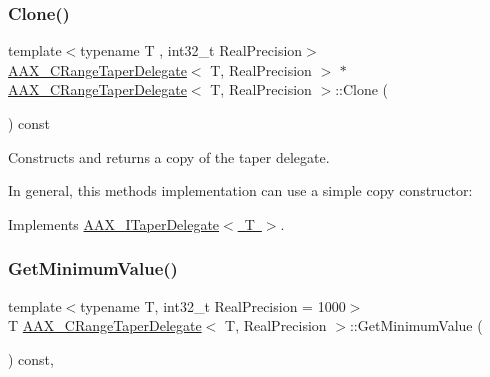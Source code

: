 \subsubsection{\texorpdfstring{Clone()}{Clone()}}
{\footnotesize\ttfamily template$<$typename T , int32\+\_\+t Real\+Precision$>$ \\
\mbox{\hyperlink{a01557}{A\+A\+X\+\_\+\+C\+Range\+Taper\+Delegate}}$<$ T, Real\+Precision $>$ $\ast$ \mbox{\hyperlink{a01557}{A\+A\+X\+\_\+\+C\+Range\+Taper\+Delegate}}$<$ T, Real\+Precision $>$\+::Clone (\begin{DoxyParamCaption}{ }\end{DoxyParamCaption}) const\hspace{0.3cm}{\ttfamily [virtual]}}



Constructs and returns a copy of the taper delegate. 

In general, this method\textquotesingle{}s implementation can use a simple copy constructor\+:


\begin{DoxyCode}{0}
\DoxyCodeLine{\textcolor{keyword}{}\{}
\DoxyCodeLine{\}}
\end{DoxyCode}
 

Implements \mbox{\hyperlink{a01881_a80ce054ca716147155fe0682adf4e469}{A\+A\+X\+\_\+\+I\+Taper\+Delegate$<$ T $>$}}.

\mbox{\label{a01557_a94f30f1ae6f4be57d2fe44928fb4a467}} 
\subsubsection{\texorpdfstring{GetMinimumValue()}{GetMinimumValue()}}
{\footnotesize\ttfamily template$<$typename T, int32\+\_\+t Real\+Precision = 1000$>$ \\
T \mbox{\hyperlink{a01557}{A\+A\+X\+\_\+\+C\+Range\+Taper\+Delegate}}$<$ T, Real\+Precision $>$\+::Get\+Minimum\+Value (\begin{DoxyParamCaption}{ }\end{DoxyParamCaption}) const\hspace{0.3cm}{\ttfamily [inline]}, {\ttfamily [virtual]}}



